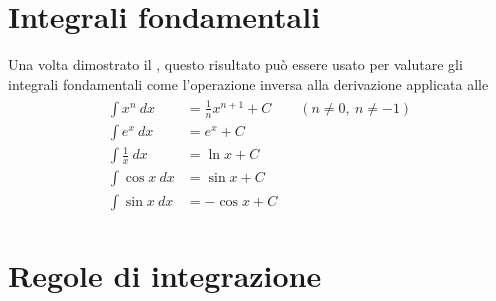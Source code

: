 \documentclass[letterpaper,10pt,italian]{jupyterBook}
\begin{document}
\section{Integrali fondamentali}
\label{\detokenize{ch/infinitesimal_calculus/integrals:integrali-fondamentali}}\label{\detokenize{ch/infinitesimal_calculus/integrals:infinitesimal-calculus-integrals-fund}}
\sphinxAtStartPar
Una volta dimostrato il {\hyperref[\detokenize{ch/infinitesimal_calculus/integrals:infinitesimal-calculus-integrals-thm-fund}]{}}, questo risultato può essere usato per valutare gli integrali fondamentali come l’operazione inversa alla derivazione applicata alle {\hyperref[\detokenize{ch/infinitesimal_calculus/integrals:infinitesimal-calculus-integrals-fund}]{}}
\begin{equation*}
\begin{split}\begin{aligned}
 \int x^n         \ dx & = \frac{1}{n} x^{n+1} + C  \qquad (n \neq 0, \ n \neq -1) \\ 
 \int e^x         \ dx & = e^x                 + C \\ 
 \int \frac{1}{x} \ dx & = \ln x               + C \\ 
 \int \cos x      \ dx & = \sin x              + C \\ 
 \int \sin x      \ dx & =-\cos x              + C    
\end{aligned}\end{split}
\end{equation*}

\section{Regole di integrazione}
\label{\detokenize{ch/infinitesimal_calculus/integrals:regole-di-integrazione}}
\end{document}

